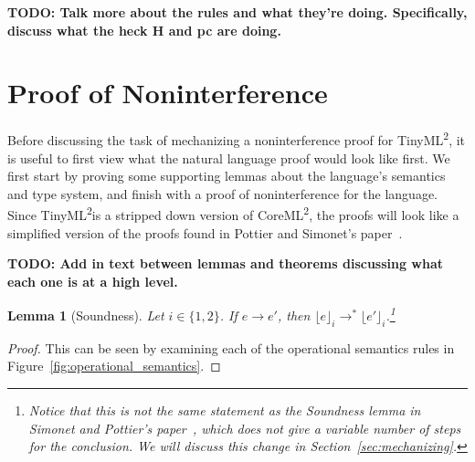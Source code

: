 \documentclass[a4paper]{article}
\newcommand{\langName}[0]{TinyML\textsuperscript{2}}
\newcommand{\origLang}[0]{CoreML\textsuperscript{2}}
\newcommand{\lift}[1]{\lfloor #1 \rfloor}
\theoremstyle{plain}
\newtheorem{lemma}{Lemma}
\theoremstyle{definition}
\begin{document}
\textbf{TODO: Talk more about the rules and what they're doing.  Specifically,
discuss what the heck H and pc are doing.}

\section{Proof of Noninterference}
\label{sec:proof}

Before discussing the task of mechanizing a noninterference proof for \langName,
it is useful to first view what the natural language proof would look like
first.  We first start by proving some supporting lemmas about the language's
semantics and type system, and finish with a proof of noninterference for the
language.  Since \langName is a stripped down version of \origLang, the proofs
will look like a simplified version of the proofs found in Pottier and Simonet's
paper~\cite{InfoFlowML}.

\textbf{TODO: Add in text between lemmas and theorems discussing what each one
is at a high level.}

\begin{lemma}[Soundness]
  \label{lem:soundness}
  Let $i \in \{1, 2\}$. If $e \to e'$, then $\lift{e}_i \to^*
  \lift{e'}_i$.\footnote{Notice that this is not the same statement as the
  Soundness lemma in Simonet and Pottier's paper~\cite{InfoFlowML}, which does
  not give a variable number of steps for the conclusion.  We will discuss this
  change in Section~\ref{sec:mechanizing}.}
\end{lemma}
\begin{proof}
  This can be seen by examining each of the operational semantics rules in
  Figure~\ref{fig:operational_semantics}.
\end{proof}
\end{document}
